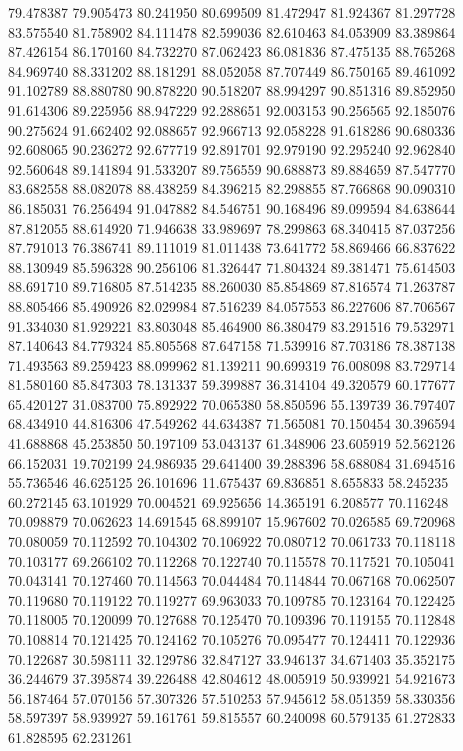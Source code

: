 79.478387
79.905473
80.241950
80.699509
81.472947
81.924367
81.297728
83.575540
81.758902
84.111478
82.599036
82.610463
84.053909
83.389864
87.426154
86.170160
84.732270
87.062423
86.081836
87.475135
88.765268
84.969740
88.331202
88.181291
88.052058
87.707449
86.750165
89.461092
91.102789
88.880780
90.878220
90.518207
88.994297
90.851316
89.852950
91.614306
89.225956
88.947229
92.288651
92.003153
90.256565
92.185076
90.275624
91.662402
92.088657
92.966713
92.058228
91.618286
90.680336
92.608065
90.236272
92.677719
92.891701
92.979190
92.295240
92.962840
92.560648
89.141894
91.533207
89.756559
90.688873
89.884659
87.547770
83.682558
88.082078
88.438259
84.396215
82.298855
87.766868
90.090310
86.185031
76.256494
91.047882
84.546751
90.168496
89.099594
84.638644
87.812055
88.614920
71.946638
33.989697
78.299863
68.340415
87.037256
87.791013
76.386741
89.111019
81.011438
73.641772
58.869466
66.837622
88.130949
85.596328
90.256106
81.326447
71.804324
89.381471
75.614503
88.691710
89.716805
87.514235
88.260030
85.854869
87.816574
71.263787
88.805466
85.490926
82.029984
87.516239
84.057553
86.227606
87.706567
91.334030
81.929221
83.803048
85.464900
86.380479
83.291516
79.532971
87.140643
84.779324
85.805568
87.647158
71.539916
87.703186
78.387138
71.493563
89.259423
88.099962
81.139211
90.699319
76.008098
83.729714
81.580160
85.847303
78.131337
59.399887
36.314104
49.320579
60.177677
65.420127
31.083700
75.892922
70.065380
58.850596
55.139739
36.797407
68.434910
44.816306
47.549262
44.634387
71.565081
70.150454
30.396594
41.688868
45.253850
50.197109
53.043137
61.348906
23.605919
52.562126
66.152031
19.702199
24.986935
29.641400
39.288396
58.688084
31.694516
55.736546
46.625125
26.101696
11.675437
69.836851
8.655833
58.245235
60.272145
63.101929
70.004521
69.925656
14.365191
6.208577
70.116248
70.098879
70.062623
14.691545
68.899107
15.967602
70.026585
69.720968
70.080059
70.112592
70.104302
70.106922
70.080712
70.061733
70.118118
70.103177
69.266102
70.112268
70.122740
70.115578
70.117521
70.105041
70.043141
70.127460
70.114563
70.044484
70.114844
70.067168
70.062507
70.119680
70.119122
70.119277
69.963033
70.109785
70.123164
70.122425
70.118005
70.120099
70.127688
70.125470
70.109396
70.119155
70.112848
70.108814
70.121425
70.124162
70.105276
70.095477
70.124411
70.122936
70.122687
30.598111
32.129786
32.847127
33.946137
34.671403
35.352175
36.244679
37.395874
39.226488
42.804612
48.005919
50.939921
54.921673
56.187464
57.070156
57.307326
57.510253
57.945612
58.051359
58.330356
58.597397
58.939927
59.161761
59.815557
60.240098
60.579135
61.272833
61.828595
62.231261
